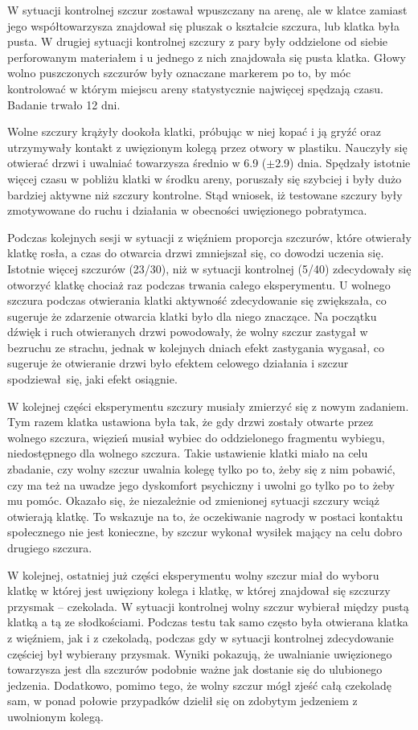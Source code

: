 \documentclass{psychol}
\begin{document}
W sytuacji kontrolnej szczur zostawał wpuszczany na arenę, ale w klatce zamiast jego współtowarzysza znajdował się pluszak o kształcie szczura, lub klatka była pusta. W drugiej sytuacji kontrolnej szczury z pary były oddzielone od siebie perforowanym materiałem i u jednego z nich znajdowała się pusta klatka. Głowy wolno puszczonych szczurów były oznaczane markerem po to, by móc kontrolować w którym miejscu areny statystycznie najwięcej spędzają czasu. Badanie trwało 12 dni.

Wolne szczury krążyły dookoła klatki, próbując w niej kopać i ją gryźć oraz utrzymywały kontakt z uwięzionym kolegą przez otwory w plastiku. Nauczyły się otwierać drzwi i uwalniać towarzysza średnio w 6.9 ($\pm$2.9) dnia. Spędzały istotnie więcej czasu w pobliżu klatki w środku areny, poruszały się szybciej i były dużo bardziej aktywne niż szczury kontrolne. Stąd wniosek, iż testowane szczury były zmotywowane do ruchu i działania w obecności uwięzionego pobratymca.

Podczas kolejnych sesji w sytuacji z więźniem proporcja szczurów, które otwierały klatkę rosła, a czas do otwarcia drzwi zmniejszał się, co dowodzi uczenia się. Istotnie więcej szczurów (23/30), niż w sytuacji kontrolnej (5/40) zdecydowały się otworzyć klatkę chociaż raz podczas trwania całego eksperymentu. U wolnego szczura podczas otwierania klatki aktywność zdecydowanie się zwiększała, co sugeruje że zdarzenie otwarcia klatki było dla niego znaczące. Na początku dźwięk i ruch otwieranych drzwi powodowały, że wolny szczur zastygał w bezruchu ze strachu, jednak w kolejnych dniach efekt zastygania wygasał, co sugeruje że otwieranie drzwi było efektem celowego działania i szczur spodziewał się, jaki efekt osiągnie.

W kolejnej części eksperymentu szczury musiały zmierzyć się z nowym zadaniem. Tym razem klatka ustawiona była tak, że gdy drzwi zostały otwarte przez wolnego szczura, więzień musiał wybiec do oddzielonego fragmentu wybiegu, niedostępnego dla wolnego szczura. Takie ustawienie klatki miało na celu zbadanie, czy wolny szczur uwalnia kolegę tylko po to, żeby się z nim pobawić, czy ma też na uwadze jego dyskomfort psychiczny i uwolni go tylko po to żeby mu pomóc. Okazało się, że niezależnie od zmienionej sytuacji szczury wciąż otwierają klatkę. To wskazuje na to, że oczekiwanie nagrody w postaci kontaktu społecznego nie jest konieczne, by szczur wykonał wysiłek mający na celu dobro drugiego szczura.

W kolejnej, ostatniej już części eksperymentu wolny szczur miał do wyboru klatkę w której jest uwięziony kolega i klatkę, w której znajdował się szczurzy przysmak -- czekolada. W sytuacji kontrolnej wolny szczur wybierał między pustą klatką a tą ze słodkościami. Podczas testu tak samo często była otwierana klatka z więźniem, jak i z czekoladą, podczas gdy w sytuacji kontrolnej zdecydowanie częściej był wybierany przysmak. Wyniki pokazują, że uwalnianie uwięzionego towarzysza jest dla szczurów podobnie ważne jak dostanie się do ulubionego jedzenia. Dodatkowo, pomimo tego, że wolny szczur mógł zjeść całą czekoladę sam, w ponad połowie przypadków dzielił się on zdobytym jedzeniem z uwolnionym kolegą.
\end{document}
